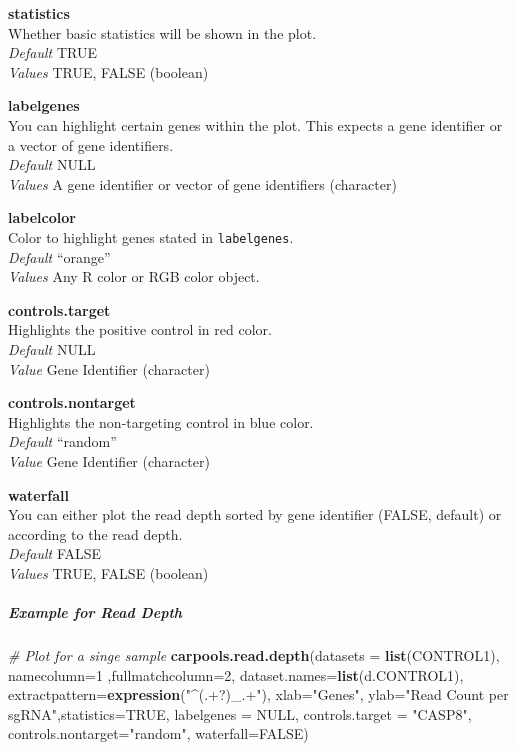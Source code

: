 \documentclass[]{article}
\newenvironment{Shaded}{\begin{snugshade}}{\end{snugshade}}
\newcommand{\KeywordTok}[1]{\textcolor[rgb]{0.13,0.29,0.53}{\textbf{{#1}}}}
\newcommand{\DataTypeTok}[1]{\textcolor[rgb]{0.13,0.29,0.53}{{#1}}}
\newcommand{\DecValTok}[1]{\textcolor[rgb]{0.00,0.00,0.81}{{#1}}}
\newcommand{\StringTok}[1]{\textcolor[rgb]{0.31,0.60,0.02}{{#1}}}
\newcommand{\CommentTok}[1]{\textcolor[rgb]{0.56,0.35,0.01}{\textit{{#1}}}}
\newcommand{\OtherTok}[1]{\textcolor[rgb]{0.56,0.35,0.01}{{#1}}}
\newcommand{\NormalTok}[1]{{#1}}
\let\oldsubparagraph\subparagraph
\renewcommand{\subparagraph}[1]{\oldsubparagraph{#1}\mbox{}}
\begin{document}
\textbf{statistics}\\
Whether basic statistics will be shown in the plot.\\
\emph{Default} TRUE\\
\emph{Values} TRUE, FALSE (boolean)

\textbf{labelgenes}\\
You can highlight certain genes within the plot. This expects a gene
identifier or a vector of gene identifiers.\\
\emph{Default} NULL\\
\emph{Values} A gene identifier or vector of gene identifiers
(character)

\textbf{labelcolor}\\
Color to highlight genes stated in \texttt{labelgenes}.\\
\emph{Default} ``orange''\\
\emph{Values} Any R color or RGB color object.

\textbf{controls.target}\\
Highlights the positive control in red color.\\
\emph{Default} NULL\\
\emph{Value} Gene Identifier (character)

\textbf{controls.nontarget}\\
Highlights the non-targeting control in blue color.\\
\emph{Default} ``random''\\
\emph{Value} Gene Identifier (character)

\textbf{waterfall}\\
You can either plot the read depth sorted by gene identifier (FALSE,
default) or according to the read depth.\\
\emph{Default} FALSE\\
\emph{Values} TRUE, FALSE (boolean)

\subparagraph{Example for Read Depth}\label{example-for-read-depth}

\begin{Shaded}
\begin{Highlighting}[]
\CommentTok{# Plot for a singe sample}
\KeywordTok{carpools.read.depth}\NormalTok{(}\DataTypeTok{datasets =} \KeywordTok{list}\NormalTok{(CONTROL1), }\DataTypeTok{namecolumn=}\DecValTok{1} \NormalTok{,}\DataTypeTok{fullmatchcolumn=}\DecValTok{2}\NormalTok{,}
  \DataTypeTok{dataset.names=}\KeywordTok{list}\NormalTok{(d.CONTROL1), }\DataTypeTok{extractpattern=}\KeywordTok{expression}\NormalTok{(}\StringTok{"^(.+?)_.+"}\NormalTok{),}
  \DataTypeTok{xlab=}\StringTok{"Genes"}\NormalTok{, }\DataTypeTok{ylab=}\StringTok{"Read Count per sgRNA"}\NormalTok{,}\DataTypeTok{statistics=}\OtherTok{TRUE}\NormalTok{, }\DataTypeTok{labelgenes =} \OtherTok{NULL}\NormalTok{,}
  \DataTypeTok{controls.target =} \StringTok{"CASP8"}\NormalTok{, }\DataTypeTok{controls.nontarget=}\StringTok{"random"}\NormalTok{, }\DataTypeTok{waterfall=}\OtherTok{FALSE}\NormalTok{)}
\end{Highlighting}
\end{Shaded}
\end{document}
